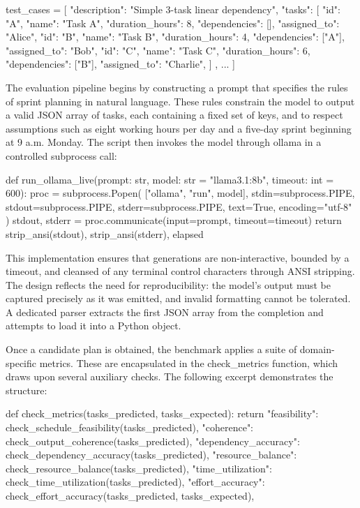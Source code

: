 \documentclass{report}
\begin{document}
\begin{python}[breaklines=true,breakatwhitespace=true]
    test_cases = [
    {
        "description": "Simple 3-task linear dependency",
        "tasks": [
            {"id": "A", "name": "Task A", "duration_hours": 8, "dependencies": [], "assigned_to": "Alice"},
            {"id": "B", "name": "Task B", "duration_hours": 4, "dependencies": ["A"], "assigned_to": "Bob"},
            {"id": "C", "name": "Task C", "duration_hours": 6, "dependencies": ["B"], "assigned_to": "Charlie"},
        ]
    },
    ...
]
\end{python}

The evaluation pipeline begins by constructing a prompt that specifies the rules of sprint planning in natural language.
These rules constrain the model to output a valid JSON array of tasks, each containing a fixed set of keys, and to respect assumptions such as eight working hours per day and a five-day sprint beginning at 9 a.m. Monday.
The script then invokes the model through ollama in a controlled subprocess call:

\begin{python}
    def run_ollama_live(prompt: str, model: str = "llama3.1:8b", timeout: int = 600):
    proc = subprocess.Popen(
        ["ollama", "run", model],
        stdin=subprocess.PIPE,
        stdout=subprocess.PIPE,
        stderr=subprocess.PIPE,
        text=True,
        encoding="utf-8"
    )
    stdout, stderr = proc.communicate(input=prompt, timeout=timeout)
    return strip_ansi(stdout), strip_ansi(stderr), elapsed

\end{python}

This implementation ensures that generations are non-interactive, bounded by a timeout, and cleansed of any terminal control characters through ANSI stripping.
The design reflects the need for reproducibility: the model’s output must be captured precisely as it was emitted, and invalid formatting cannot be tolerated.
A dedicated parser extracts the first JSON array from the completion and attempts to load it into a Python object.

Once a candidate plan is obtained, the benchmark applies a suite of domain-specific metrics. 
These are encapsulated in the check_metrics function, which draws upon several auxiliary checks. 
The following excerpt demonstrates the structure:

\begin{python}
    def check_metrics(tasks_predicted, tasks_expected):
    return {
        "feasibility": check_schedule_feasibility(tasks_predicted),
        "coherence": check_output_coherence(tasks_predicted),
        "dependency_accuracy": check_dependency_accuracy(tasks_predicted),
        "resource_balance": check_resource_balance(tasks_predicted),
        "time_utilization": check_time_utilization(tasks_predicted),
        "effort_accuracy": check_effort_accuracy(tasks_predicted, tasks_expected),
    }

\end{python}
\end{document}
